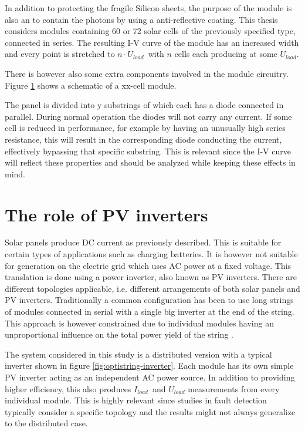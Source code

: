 In addition to protecting the fragile Silicon sheets, the purpose of the module is also an to contain the photons by using a anti-reflective coating.
This thesis considers modules containing 60 or 72 solar cells of the previously specified type, connected in series.
The resulting I-V curve of the module has an increased width and every point is stretched to $n \cdot U_{load}$ with $n$ cells each producing at some $U_{load}$.

There is however also some extra components involved in the module circuitry.
Figure \ref{} shows a schematic of a xx-cell module.

The panel is divided into y substrings of which each has a diode connected in parallel.
During normal operation the diodes will not carry any current.
If some cell is reduced in performance, for example by having an unusually high series resistance, this will result in the corresponding diode conducting the current, effectively bypassing that specific substring\cite{Roman2006}.
This is relevant since the I-V curve will reflect these properties and should be analyzed while keeping these effects in mind.

\section{The role of PV inverters}
Solar panels produce DC current as previously described.
This is suitable for certain types of applications such as charging batteries.
It is however not suitable for generation on the electric grid which uses AC power at a fixed voltage.
This translation is done using a power inverter, also known as PV inverters.
There are different topologies applicable, i.e. different arrangements of both solar panels and PV inverters.
Traditionally a common configuration has been to use long strings of modules connected in serial with a single big inverter at the end of the string.
This approach is however constrained due to individual modules having an unproportional influence on the total power yield of the string \cite{Roman2006}.


The system considered in this study is a distributed version with a typical inverter shown in figure \ref{fig:optistring-inverter}.
Each module has its own simple PV inverter acting as an independent AC power source.
In addition to providing higher efficiency, this also produces $I_{load}$ and $U_{load}$ measurements from every individual module.
This is highly relevant since studies in fault detection typically consider a specific topology and the results might not always generalize to the distributed case.

